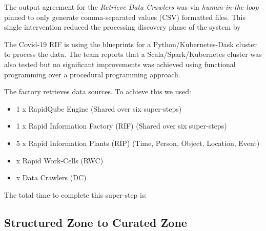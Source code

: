 The output agreement for the \emph{Retrieve Data Crawlers} was via \emph{human-in-the-loop} pinned to only generate comma-separated values (CSV) formatted files. This single intervention reduced the processing discovery phase of the system by {\color{red}{?? Get values}} %

The Covid-19 RIF is using the blueprints for a Python/Kubernetes-Dask cluster to process the data. The team reports that a Scala/Spark/Kubernetes cluster was also tested but no significant improvements was achieved using functional programming over a procedural programming approach.

The factory retrieves {\color{red}{??}} data sources.
To achieve this we used:
\begin{itemize}
    \item 1 x RapidQube Engine (Shared over six super-steps)
    \item 1 x Rapid Information Factory (RIF) (Shared over six super-steps)
    \item 5 x Rapid Information Plants (RIP) (Time, Person, Object, Location, Event)
    \item {\color{red}{??}} x Rapid Work-Cells (RWC)
    \item {\color{red}{??}} x Data Crawlers (DC)
\end{itemize}

The total time to complete this super-step is: {\color{red}{??}}



\subsection{Structured Zone to Curated Zone}

{\color{red}{VJ:
I don't really see where the model to predict the number of infections would fit into and this doesn't sound as a particular research novelty (unless we develop a better model than the existing ones, which would probably be impossible to prove). But if we go for some other angle, that could change things.}}

